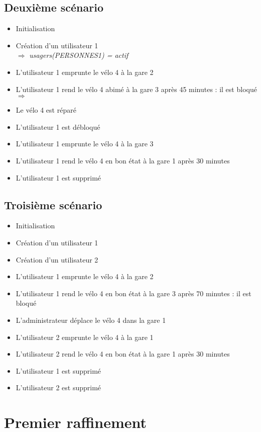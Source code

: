 \documentclass[12pt]{article}
\begin{document}
\subsection{Deuxième scénario}
\begin{itemize}
  \item Initialisation
  \item Création d'un utilisateur 1 \\
  $\Rightarrow$ \textit{usagers(PERSONNES1) = actif}
  \item L'utilisateur 1 emprunte le vélo 4 à la gare 2 \\
  \item L'utilisateur 1 rend le vélo 4 abimé à la gare 3 après 45 minutes : il est bloqué
  $\Rightarrow$ \textit{}
  \item Le vélo 4 est réparé
  \item L'utilisateur 1 est débloqué
  \item L'utilisateur 1 emprunte le vélo 4 à la gare 3
  \item L'utilisateur 1 rend le vélo 4 en bon état à la gare 1 après 30 minutes
  \item L'utilisateur 1 est supprimé
\end{itemize}
\subsection{Troisième scénario}
\begin{itemize}
  \item Initialisation
  \item Création d'un utilisateur 1
  \item Création d'un utilisateur 2
  \item L'utilisateur 1 emprunte le vélo 4 à la gare 2
  \item L'utilisateur 1 rend le vélo 4 en bon état à la gare 3 après 70 minutes : il est bloqué
  \item L'administrateur déplace le vélo 4 dans la gare 1
  \item L'utilisateur 2 emprunte le vélo 4 à la gare 1
  \item L'utilisateur 2 rend le vélo 4 en bon état à la gare 1 après 30 minutes
  \item L'utilisateur 1 est supprimé
  \item L'utilisateur 2 est supprimé
\end{itemize}
\newpage
\section{Premier raffinement}
\end{document}
